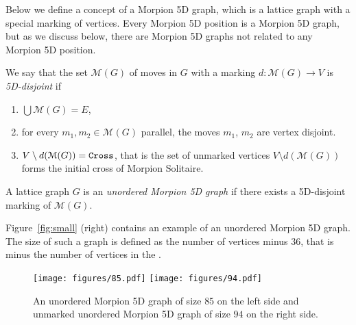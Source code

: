 Below we define a concept of a Morpion 5D graph, which is a lattice graph with a special marking of vertices. Every Morpion 5D position is
a Morpion 5D graph, but as we discuss below, there are Morpion 5D graphs not related to any Morpion 5D position.

\begin{definition}
\label{def:disjoint}
    We say that the set $\mathcal{M}(G)$ of moves in $G$ with a marking $d \colon \mathcal{M}(G) \to V$ is \emph{5D-disjoint} if
      \begin{enumerate}
        \item $\bigcup \mathcal{M}(G) = E$,
        \item for every $m_1, m_2 \in \mathcal{M}(G)$ parallel, the moves $m_1$, $m_2$ are vertex disjoint.
        \item $V \setminus d(\mathcal{M}(G)) = \texttt{Cross}$, that is the set of unmarked vertices $V \setminus d(\mathcal{M}(G))$ forms the initial cross of Morpion Solitaire. \label{markings}
      \end{enumerate}
\end{definition}

\begin{definition}
  A lattice graph $G$ is an \emph{unordered Morpion 5D graph} if there exists a 5D-disjoint marking of $\mathcal{M}(G)$. 
\end{definition}

Figure~\ref{fig:small} (right) contains an example of an unordered Morpion 5D graph.  %
 The size of such a graph  is defined as the number of vertices minus $36$, that is minus the number of vertices in the \Cross. %

\begin{figure}[h]
    \texttt{[image: figures/85.pdf]}
    \texttt{[image: figures/94.pdf]}
    \caption{\label{fig:85}
      An unordered Morpion 5D graph of size $85$ on the left side
        and unmarked unordered Morpion 5D graph of size $94$ on the right side. 
    }
\end{figure}

